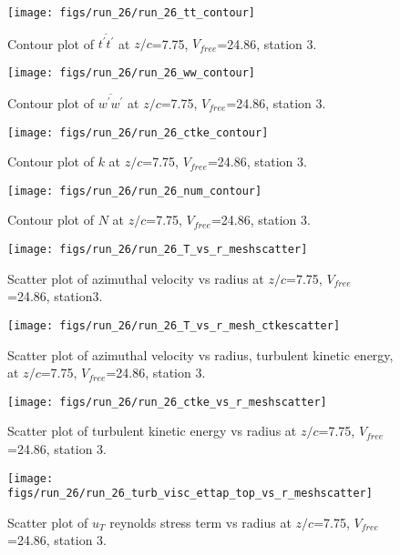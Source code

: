 \begin{figure}[H]
\centering
\texttt{[image: figs/run\_26/run\_26\_tt\_contour]}
\caption{Contour plot of $\overline{t^\prime t^\prime}$ at $z/c$=7.75, $V_{free}$=24.86, station 3.}
\end{figure}


\begin{figure}[H]
\centering
\texttt{[image: figs/run\_26/run\_26\_ww\_contour]}
\caption{Contour plot of $\overline{w^\prime w^\prime}$ at $z/c$=7.75, $V_{free}$=24.86, station 3.}
\end{figure}


\begin{figure}[H]
\centering
\texttt{[image: figs/run\_26/run\_26\_ctke\_contour]}
\caption{Contour plot of $k$ at $z/c$=7.75, $V_{free}$=24.86, station 3.}
\end{figure}


\begin{figure}[H]
\centering
\texttt{[image: figs/run\_26/run\_26\_num\_contour]}
\caption{Contour plot of $N$ at $z/c$=7.75, $V_{free}$=24.86, station 3.}
\end{figure}


\begin{figure}[H]
\centering
\texttt{[image: figs/run\_26/run\_26\_T\_vs\_r\_meshscatter]}
\caption{Scatter plot of azimuthal velocity vs radius at $z/c$=7.75, $V_{free}$=24.86, station3.}
\end{figure}


\begin{figure}[H]
\centering
\texttt{[image: figs/run\_26/run\_26\_T\_vs\_r\_mesh\_ctkescatter]}
\caption{Scatter plot of azimuthal velocity vs radius, turbulent kinetic energy, at $z/c$=7.75, $V_{free}$=24.86, station 3.}
\end{figure}


\begin{figure}[H]
\centering
\texttt{[image: figs/run\_26/run\_26\_ctke\_vs\_r\_meshscatter]}
\caption{Scatter plot of turbulent kinetic energy vs radius at $z/c$=7.75, $V_{free}$=24.86, station 3.}
\end{figure}


\begin{figure}[H]
\centering
\texttt{[image: figs/run\_26/run\_26\_turb\_visc\_ettap\_top\_vs\_r\_meshscatter]}
\caption{Scatter plot of $
u_T$ reynolds stress term vs radius at $z/c$=7.75, $V_{free}$=24.86, station 3.}
\end{figure}


